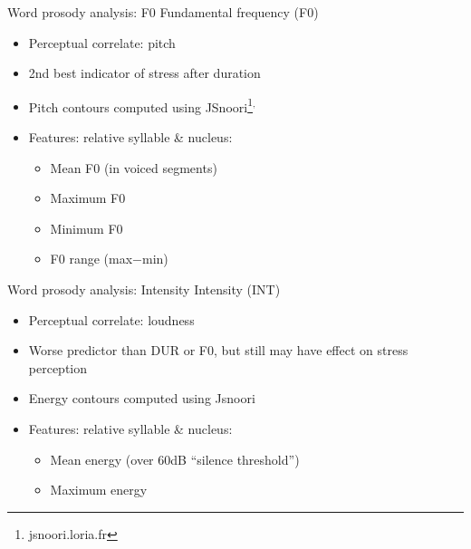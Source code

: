 \documentclass[xcolor={dvipsnames}]{beamer}
\newcommand{\TODO}[1]{{\color{red}\textbf{[TODO #1]}}}
\begin{document}
		\begin{frame}{Word prosody analysis: F0}
		 Fundamental frequency (F0)
			\begin{itemize}
			\item Perceptual correlate: pitch
			\item 2nd best indicator of stress after duration
			\item Pitch contours computed using JSnoori\footnote{jsnoori.loria.fr}$^{,}$
			\item Features: relative syllable \& nucleus:
				\begin{itemize}
				\item Mean F0 (in voiced segments)
				\item Maximum F0
				\item Minimum F0 
				\item F0 range (max$-$min)
				\end{itemize}
			\end{itemize}
		\end {frame}
			
		\begin{frame}{Word prosody analysis: Intensity}
		Intensity (INT)
			\begin{itemize}
			\item Perceptual correlate: loudness
			\item Worse predictor than DUR or F0, but still may have effect on stress perception
			\item Energy contours computed using Jsnoori
			\item Features: relative syllable \& nucleus:
				\begin{itemize}
				\item Mean energy (over 60dB ``silence threshold'')
				\item Maximum energy
				\end{itemize}
			\end{itemize}
		\end{frame}
		
		
	
\end{document}
